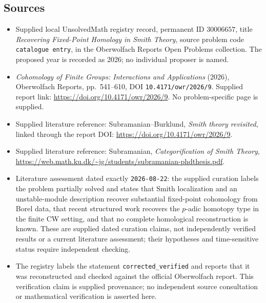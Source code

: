 \documentclass[11pt]{article}
\begin{document}
\subsection{Sources}
\begin{itemize}
\item Supplied local UnsolvedMath registry record, permanent ID \(30006657\), title \emph{Recovering Fixed-Point Homology in Smith Theory}, source problem code \texttt{catalogue entry}, in the Oberwolfach Reports Open Problems collection. The proposed year is recorded as 2026; no individual proposer is named.
\item \emph{Cohomology of Finite Groups: Interactions and Applications} (2026), Oberwolfach Reports, pp.\ 541--610, DOI \texttt{10.4171/owr/2026/9}. Supplied report link: \url{https://doi.org/10.4171/owr/2026/9}. No problem-specific page is supplied.
\item Supplied literature reference: Subramanian--Burklund, \emph{Smith theory revisited}, linked through the report DOI: \url{https://doi.org/10.4171/owr/2026/9}.
\item Supplied literature reference: Subramanian, \emph{Categorification of Smith Theory}, \url{https://web.math.ku.dk/~jg/students/subramanian-phdthesis.pdf}.
\item Literature assessment dated exactly \texttt{2026-08-22}: the supplied curation labels the problem partially solved and states that Smith localization and an unstable-module description recover substantial fixed-point cohomology from Borel data, that recent structured work recovers the \(p\)-adic homotopy type in the finite CW setting, and that no complete homological reconstruction is known. These are supplied dated curation claims, not independently verified results or a current literature assessment; their hypotheses and time-sensitive status require independent checking.
\item The registry labels the statement \texttt{corrected\_verified} and reports that it was reconstructed and checked against the official Oberwolfach report. This verification claim is supplied provenance; no independent source consultation or mathematical verification is asserted here.
\end{itemize}
\end{document}
